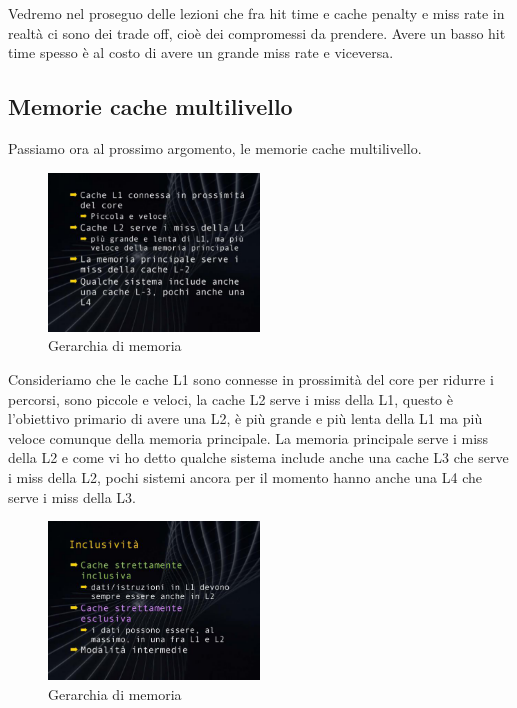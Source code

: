 Vedremo nel proseguo delle lezioni che fra hit time e cache penalty e miss rate in realtà ci sono dei trade off, cioè dei compromessi da prendere.
Avere un basso hit time spesso è al costo di avere un grande miss rate e viceversa.

\subsection{Memorie cache multilivello}

Passiamo ora al prossimo argomento, le memorie cache multilivello.

\FloatBarrier
\begin{figure}[H]
  \centering
  \includegraphics[width=0.50\textwidth,
                    trim=20 20 10 20, %
                    clip]
                    {images/Lez06_p04_fig_06.png}
  \caption{Gerarchia di memoria}
  \label{fig:Lez06_p02_fig_05}
\end{figure}
\FloatBarrier
\noindent

Consideriamo che le cache L1 sono connesse in prossimità del core per ridurre i percorsi, sono piccole e veloci, la cache L2 serve i miss della L1, questo è l'obiettivo primario di avere una L2, è più grande e più lenta della L1 ma più veloce comunque della memoria principale.
La memoria principale serve i miss della L2 e come vi ho detto qualche sistema include anche una cache L3 che serve i miss della L2, pochi sistemi ancora per il momento hanno anche una L4 che serve i miss della L3.

\FloatBarrier
\begin{figure}[H]
  \centering
  \includegraphics[width=0.50\textwidth,
                    trim=20 20 10 20, %
                    clip]
                    {images/Lez06_p05_fig_01.png}
  \caption{Gerarchia di memoria}
  \label{fig:Lez06_p05_fig_01}
\end{figure}
\FloatBarrier
\noindent

